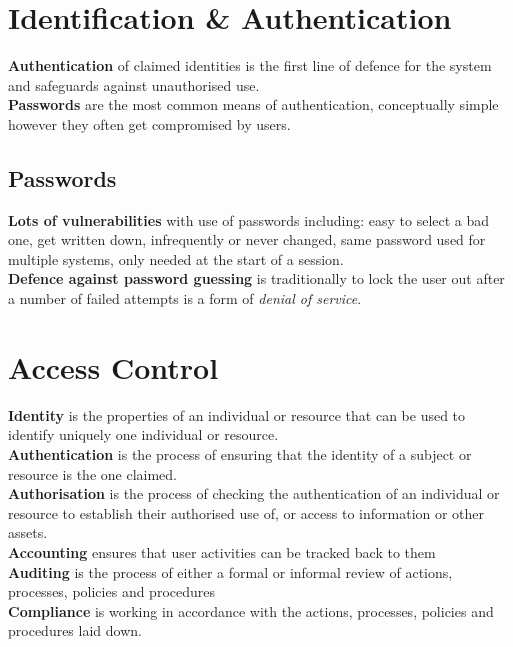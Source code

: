 \documentclass[a4paper,11pt]{article}
\begin{document}
\section{Identification \& Authentication}
\textbf{Authentication} of claimed identities is the first line of defence for the system and safeguards against unauthorised use.\\
\textbf{Passwords} are the most common means of authentication, conceptually simple however they often get compromised by users.
\subsection{Passwords}
\textbf{Lots of vulnerabilities} with use of passwords including: easy to select a bad one, get written down, infrequently or never changed, same password used for multiple systems, only needed at the start of a session.\\
\textbf{Defence against password guessing} is traditionally to lock the user out after a number of failed attempts is a form of \textit{denial of service}. 

\section{Access Control}
\textbf{Identity} is the properties of an individual or resource that can be used to identify uniquely one individual or resource.\\
\textbf{Authentication} is the process of ensuring that the identity of a subject or resource is the one claimed.\\
\textbf{Authorisation} is the process of checking the authentication of an individual or resource to establish their authorised use of, or access to information or other assets.\\
\textbf{Accounting} ensures that user activities can be tracked back to them\\
\textbf{Auditing} is the process of either a formal or informal review of actions, processes, policies and procedures\\
\textbf{Compliance} is working in accordance with the actions, processes, policies and procedures laid down. 
\end{document}
